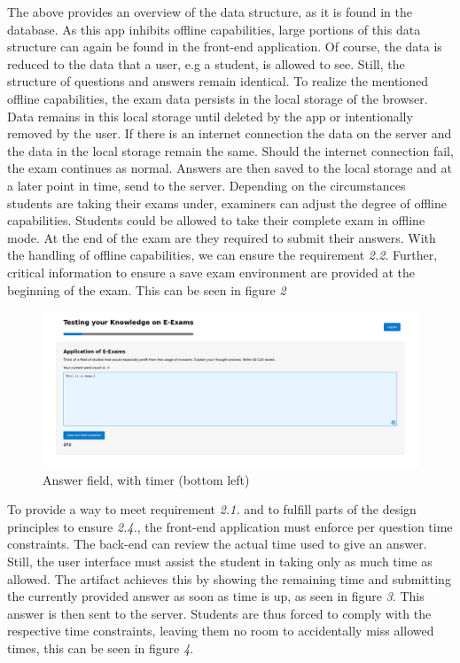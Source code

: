 The above provides an overview of the data structure, as it is found in
the database. As this app inhibits offline capabilities, large portions
of this data structure can again be found in the front-end application.
Of course, the data is reduced to the data that a user, e.g a student,
is allowed to see. Still, the structure of questions and answers remain
identical. To realize the mentioned offline capabilities, the exam data
persists in the local storage of the browser. Data remains in this local
storage until deleted by the app or intentionally removed by the user.
If there is an internet connection the data on the server and the data
in the local storage remain the same. Should the internet connection
fail, the exam continues as normal. Answers are then saved to the local
storage and at a later point in time, send to the server. Depending on
the circumstances students are taking their exams under, examiners can
adjust the degree of offline capabilities. Students could be allowed to
take their complete exam in offline mode. At the end of the exam are
they required to submit their answers. With the handling of offline
capabilities, we can ensure the requirement \emph{2.2}. Further,
critical information to ensure a save exam environment are provided at
the beginning of the exam. This can be seen in figure \emph{2}

\begin{figure}
\centering
\includegraphics{../figures/answerCrop.png}
\caption{Answer field, with timer (bottom left)}
\end{figure}

To provide a way to meet requirement \emph{2.1.} and to fulfill parts of
the design principles to ensure \emph{2.4.}, the front-end application
must enforce per question time constraints. The back-end can review the
actual time used to give an answer. Still, the user interface must
assist the student in taking only as much time as allowed. The artifact
achieves this by showing the remaining time and submitting the currently
provided answer as soon as time is up, as seen in figure \emph{3}. This
answer is then sent to the server. Students are thus forced to comply
with the respective time constraints, leaving them no room to
accidentally miss allowed times, this can be seen in figure \emph{4}.

